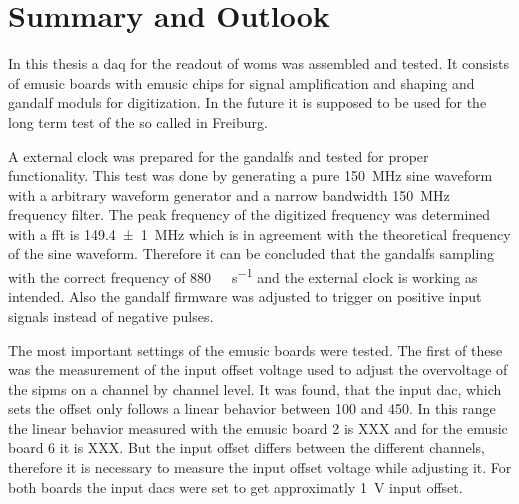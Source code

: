 \chapter{Summary and Outlook}
In this thesis a \ac{daq} for the readout of \acp{wom} was assembled and tested.
It consists of \ac{emusic} boards with \ac{emusic} chips for signal amplification and shaping and \ac{gandalf} moduls for digitization.
In the future it is supposed to be used for the long term test of the so called  in Freiburg.

A external clock was prepared for the \acp{gandalf} and tested for proper functionality.
This test was done by generating a pure \SI{150}{\mega\hertz} sine waveform with a arbitrary waveform generator and a narrow bandwidth \SI{150}{\mega\hertz} frequency filter.
The peak frequency of the digitized frequency was determined with a \ac{fft} is \SI{149.4(10)}{\mega\hertz} which is in agreement with the theoretical frequency of the sine waveform.
Therefore it can be concluded that the \acp{gandalf} sampling with the correct frequency of \SI{880}{\mega\sample\per\second} and the external clock is working as intended.
Also the \ac{gandalf} firmware was adjusted to trigger on positive input signals instead of negative pulses.

The most important settings of the \ac{emusic} boards were tested.
The first of these was the measurement of the input offset voltage used to adjust the overvoltage of the \acp{sipm} on a channel by channel level.
It was found, that the input \ac{dac}, which sets the offset only follows a linear behavior between \SI{100}{\dacu} and \SI{450}{\dacu}.
In this range the linear behavior measured with the \ac{emusic} board 2 is XXX and for the \ac{emusic} board 6 it is XXX.
But the input offset differs between the different channels, therefore it is necessary to measure the input offset voltage while adjusting it.
For both boards the input \acp{dac} were set to get approximatly \SI{1}{\volt} input offset.


